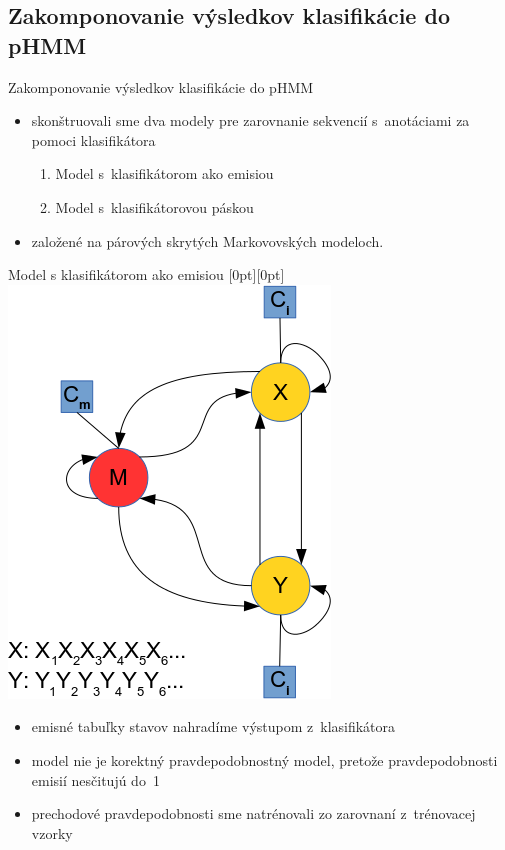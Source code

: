 \documentclass[xcolor=dvipsnames, compress, 12pt]{beamer}
\newcommand{\lenitem}[2][.6\linewidth]{\parbox[t]{#1}{\strut #2\strut}}
\theoremstyle{definition}
\begin{document}
\subsection{Zakomponovanie výsledkov klasifikácie do pHMM}
\begin{frame}{Zakomponovanie výsledkov klasifikácie do pHMM}

\begin{itemize}
  \item skonštruovali sme dva modely pre zarovnanie sekvencií s~anotáciami za pomoci klasifikátora
  \begin{enumerate}
    \item Model s~klasifikátorom ako emisiou
    \item Model s~klasifikátorovou páskou
  \end{enumerate}
  \item založené na párových skrytých Markovovských modeloch.
\end{itemize}

\end{frame}

\begin{frame}{Model s klasifikátorom ako emisiou}
  \mbox{}\hfill\raisebox{-\height}[0pt][0pt]{
   \includegraphics[width=.30\textwidth]{images/zakladny_model}
   }
  \vspace*{-\baselineskip}

  \begin{itemize}
    \item \lenitem{emisné tabuľky stavov nahradíme výstupom z~klasifikátora}
    \item \lenitem{model nie je korektný pravdepodobnostný model, pretože pravdepodobnosti emisií nesčitujú do~1}
    \item \lenitem{prechodové pravdepodobnosti sme natrénovali zo zarovnaní z~trénovacej vzorky}
  \end{itemize}
\end{frame}

\end{document}
